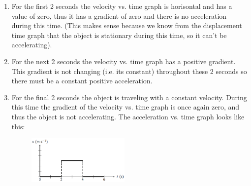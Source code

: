 {\begin{mdframed}[linewidth=4, leftmargin=40, rightmargin=40]
\begin{exercise}
\begin{enumerate}[noitemsep, label=\textbf{Step} \textbf{\arabic*}. ]
\begin{figure}[H]
\begin{center}
      \vspace{2pt}
    \vspace{.1in}
    
    \end{center}

 \end{figure}   

    \addtocounter{footnote}{-0}
    
      \par 
      \label{m38795*id73505}Once we have the velocity vs. time graph its much easier to get the acceleration vs. time graph as we know that the gradient of a velocity vs. time graph is the just the acceleration.\par 
      \item  
      \label{m38795*id73517}For the first 2 seconds the velocity vs. time graph is horisontal and has a value of zero, thus it has a gradient of zero and there is no acceleration during this time. (This makes sense because we know from the displacement time graph that the object is stationary during this time, so it can't be accelerating).\par 
      \item  
      \label{m38795*id73530}For the next 2 seconds the velocity vs. time graph has a positive gradient. This gradient is not changing (i.e. its constant) throughout these 2 seconds so there must be a constant positive acceleration.\par 
      \item  
      \label{m38795*id73543}For the final 2 seconds the object is traveling with a constant velocity. During this time the gradient of the velocity vs. time graph is once again zero, and thus the object is not accelerating.
The acceleration vs. time graph looks like this:\par 
      \label{m38795*id73548}
        
    \setcounter{subfigure}{0}


	\begin{figure}[H] %
    \begin{center}
    \label{m38795*id73551!!!underscore!!!media}\label{m38795*id73551!!!underscore!!!printimage}\includegraphics[width=5cm]{col11305.imgs/m38795_PG10C2_040.png} %
        

\end{center}
\end{figure}
\end{enumerate}
\end{exercise}
\end{mdframed}}
